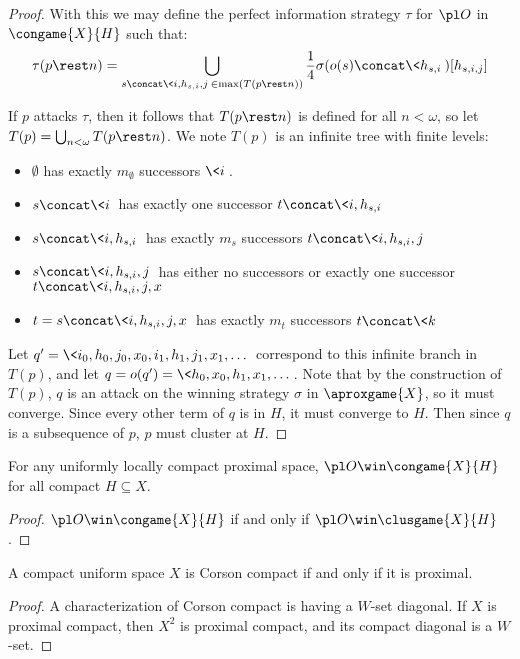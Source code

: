 \begin{proof}
  With this we may define the perfect information strategy $\tau$ for $\pl O$ in $\congame{X}{H}$ such that:
  \[
    \tau(p\rest n) = \bigcup_{s\concat\<i,h_{s,i},j\>\in\max(T(p\rest n))} \frac{1}{4}\sigma(o(s)\concat\<h_{s,i}\>)[h_{s,i,j}]
  \]

  If $p$ attacks $\tau$, then it follows that $T(p\rest n)$ is defined for all $n<\omega$, so let $T(p)=\bigcup_{n<\omega} T(p\rest n)$. We note $T(p)$ is an infinite tree with finite levels:
    \begin{itemize}
      \item $\emptyset$ has exactly $m_\emptyset$ successors $\<i\>$.
      \item $s\concat\<i\>$ has exactly one successor $t\concat\<i,h_{s,i}\>$
      \item $s\concat\<i,h_{s,i}\>$ has exactly $m_s$ successors $t\concat\<i,h_{s,i},j\>$
      \item $s\concat\<i,h_{s,i},j\>$ has either no successors or exactly one successor $t\concat\<i,h_{s,i},j,x\>$
      \item $t=s\concat\<i,h_{s,i},j,x\>$ has exactly $m_t$ successors $t\concat\<k\>$
    \end{itemize}

  Let $q'=\<i_0,h_0,j_0,x_0,i_1,h_1,j_1,x_1,\dots\>$ correspond to this infinite branch in $T(p)$, and let $q=o(q')=\<h_0,x_0,h_1,x_1,\dots\>$. Note that by the construction of $T(p)$, $q$ is an attack on the winning strategy $\sigma$ in $\aproxgame{X}$, so it must converge. Since every other term of $q$ is in $H$, it must converge to $H$. Then since $q$ is a subsequence of $p$, $p$ must cluster at $H$.
\end{proof}


\begin{cor}
  For any uniformly locally compact proximal space, $\pl O\win \congame{X}{H}$ for all compact $H\subseteq X$.
\end{cor}

\begin{proof}
  $\pl O \win \congame{X}{H}$ if and only if $\pl O \win \clusgame{X}{H}$.
\end{proof}

\begin{cor}
  A compact uniform space $X$ is Corson compact if and only if it is proximal.
\end{cor}

\begin{proof}
  A characterization of Corson compact is having a $W$-set diagonal. If $X$ is proximal compact, then $X^2$ is proximal compact, and its compact diagonal is a $W$-set.
\end{proof}









